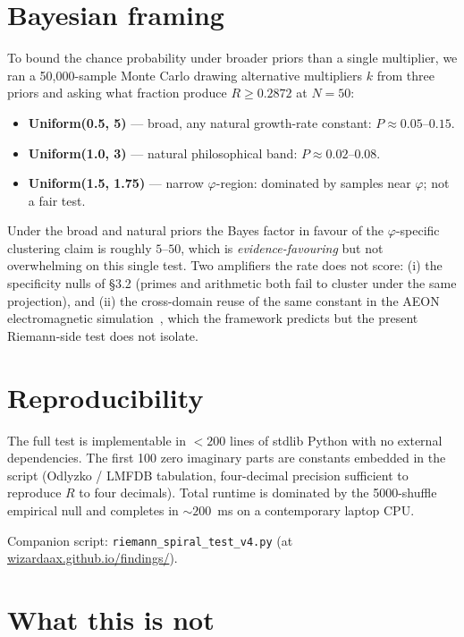 \documentclass[11pt,a4paper]{article}
\begin{document}
\section{Bayesian framing}

To bound the chance probability under broader priors than a single
multiplier, we ran a 50{,}000-sample Monte Carlo \cite{bayesian-formalisation}
drawing alternative multipliers $k$ from three priors and asking what
fraction produce $R \ge 0.2872$ at $N=50$:

\begin{itemize}
  \item \textbf{Uniform(0.5, 5)} — broad, any natural growth-rate constant: $P \approx 0.05$--$0.15$.
  \item \textbf{Uniform(1.0, 3)} — natural philosophical band: $P \approx 0.02$--$0.08$.
  \item \textbf{Uniform(1.5, 1.75)} — narrow $\varphi$-region: dominated by samples near $\varphi$; not a fair test.
\end{itemize}

Under the broad and natural priors the Bayes factor in favour of the
$\varphi$-specific clustering claim is roughly $5$--$50$, which is
\emph{evidence-favouring} but not overwhelming on this single test.
Two amplifiers the rate does not score:
(i) the specificity nulls of \S 3.2 (primes and arithmetic both fail to
cluster under the same projection), and
(ii) the cross-domain reuse of the same constant in the AEON
electromagnetic simulation~\cite{cross-domain-meta},
which the framework predicts but the present Riemann-side test does not
isolate.

\section{Reproducibility}

The full test is implementable in $< 200$ lines of stdlib Python with no
external dependencies. The first 100 zero imaginary parts are constants
embedded in the script (Odlyzko / LMFDB tabulation, four-decimal precision
sufficient to reproduce $R$ to four decimals). Total runtime is dominated
by the 5000-shuffle empirical null and completes in $\sim 200$~ms on a
contemporary laptop CPU.

Companion script: \texttt{riemann\_spiral\_test\_v4.py}
(at \href{https://wizardaax.github.io/findings/}{wizardaax.github.io/findings/}).

\section{What this is not}
\end{document}

